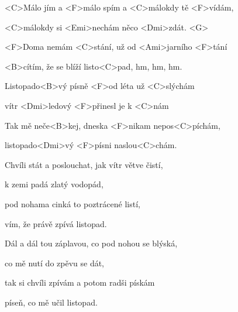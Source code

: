 

\zs
<C>Málo jím a <F>málo spím a <C>málokdy tě <F>vídám, 

<C>málokdy si <Emi>nechám něco <Dmi>zdát. <G> 

<F>Doma nemám <C>stání, už od <Ami>jarního <F>tání 

<B>cítím, že se blíží listo<C>pad, hm, hm, hm.
\ks

\zr
Listopado<B>vý písně <F>od léta už <C>slýchám 

vítr <Dmi>ledový <F>přinesl je k <C>nám 

Tak mě neče<B>kej, dneska <F>nikam nepos<C>píchám,

listopado<Dmi>vý <F>písni naslou<C>chám.
\kr

\zs
Chvíli stát a poslouchat, jak vítr větve čistí,

k zemi padá zlatý vodopád,

pod nohama cinká to poztrácené listí,

vím, že právě zpívá listopad.
\ks

\zr

\kr

\zs
Dál a dál tou záplavou, co pod nohou se blýská,

co mě nutí do zpěvu se dát,

tak si chvíli zpívám a potom radši pískám

píseň, co mě učil listopad.
\ks

\zr
\kr

\kp
